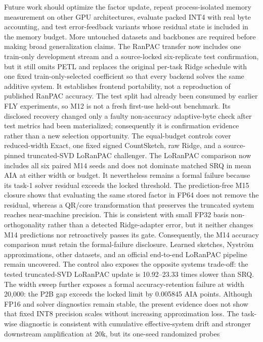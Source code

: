 \documentclass[runningheads]{llncs}
\begin{document}
Future work should optimize the factor update, repeat process-isolated memory
measurement on other GPU architectures, evaluate packed INT4 with real byte accounting, and test
error-feedback variants whose residual state is included in the memory budget.
More untouched datasets and backbones are required before making broad
generalization claims. The RanPAC transfer now includes one train-only
development stream and a source-locked six-replicate test confirmation, but it
still omits PETL and replaces the original per-task Ridge
schedule with one fixed train-only-selected coefficient so that every backend
solves the same additive system. It establishes frontend portability, not a
reproduction of published RanPAC accuracy. The test split had already been
consumed by earlier FLY experiments, so M12 is not a fresh first-use held-out
benchmark. Its disclosed recovery changed only a faulty non-accuracy
adaptive-byte check after test metrics had been materialized; consequently it
is confirmation evidence rather than a new selection opportunity. The
equal-budget controls cover reduced-width Exact, one fixed signed CountSketch,
raw Ridge, and a source-pinned truncated-SVD LoRanPAC challenger. The LoRanPAC
comparison now includes all six paired M14 seeds and does not dominate matched
SRQ in mean AIA at either width or budget. It nevertheless remains a formal
failure because its task-1 solver residual exceeds the locked threshold. The
prediction-free M15 closure shows that evaluating the same stored factor in
FP64 does not remove the residual, whereas a QR/core transformation that
preserves the truncated system reaches near-machine precision. This is
consistent with small FP32 basis non-orthogonality rather than a detected
Ridge-adapter error, but it neither changes M14 predictions nor retroactively
passes its gate. Consequently, the M14 accuracy comparison must retain the
formal-failure disclosure. Learned sketches, Nystr\"om approximations, other
datasets, and an official end-to-end LoRanPAC pipeline remain uncovered. The
control also exposes the opposite systems trade-off: the tested truncated-SVD
LoRanPAC update is 10.92--23.33 times slower than SRQ.
The width sweep further exposes a formal accuracy-retention failure at width
20,000: the P2B gap exceeds the locked limit by 0.005845 AIA points. Although
FP16 and solver diagnostics remain stable, the present evidence does not show
that fixed INT8 precision scales without increasing approximation loss. The
task-wise diagnostic is consistent with cumulative effective-system drift and
stronger downstream amplification at 20k, but its one-seed randomized probes
\end{document}
